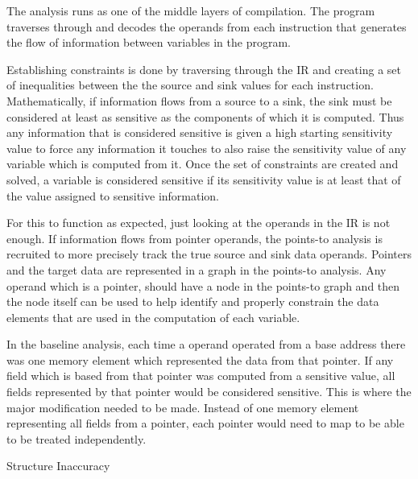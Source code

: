 \documentclass[11pt,a4paper]{article}
\begin{document}
  The analysis runs as one of the middle layers of compilation. The program
  traverses through and decodes the operands from each instruction that
  generates the flow of information between variables in the program.

  Establishing constraints is done by traversing through the IR and creating a
  set of inequalities between the the source and sink values for each
  instruction. Mathematically, if information flows from a source to a sink, the
  sink must be considered at least as sensitive as the components of which it is
  computed. Thus any information that is considered sensitive is given a high
  starting sensitivity value to force any information it touches to also raise
  the sensitivity value of any variable which is computed from it. Once the set
  of constraints are created and solved, a variable is considered sensitive if
  its sensitivity value is at least that of the value assigned to sensitive
  information.

  
  For this to function as expected, just looking at the operands in the IR is
  not enough. If information flows from pointer operands, the points-to analysis
  is recruited to more precisely track the true source and sink data operands.
  Pointers and the target data are represented in a graph in the points-to
  analysis. Any operand which is a pointer, should have a node in the points-to
  graph and then the node itself can be used to help identify and properly
  constrain the data elements that are used in the computation of each variable.

  In the baseline analysis, each time a operand operated from a base address
  there was one memory element which represented the data from that pointer. If
  any field which is based from that pointer was computed from a sensitive
  value, all fields represented by that pointer would be considered sensitive.
  This is where the major modification needed to be made. Instead of one memory
  element representing all fields from a pointer, each pointer would need to map
  to be able to be treated independently.

\begin{algorithm}

\caption{Structure Inaccuracy}
\label{alg:inacc}
\end{algorithm}
\end{document}
